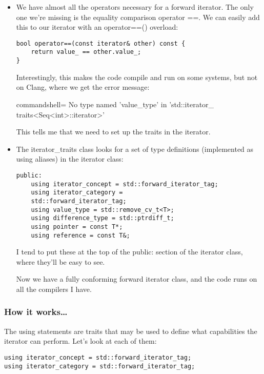 \begin{itemize}
\item 
We have almost all the operators necessary for a forward iterator. The only one we're missing is the equality comparison operator ==. We can easily add this to our iterator with an operator==() overload:

\begin{lstlisting}[style=styleCXX]
bool operator==(const iterator& other) const {
	return value_ == other.value_;
}
\end{lstlisting}

Interestingly, this makes the code compile and run on some systems, but not on Clang, where we get the error message:

\begin{tcblisting}{commandshell={}}
No type named 'value_type' in 'std::iterator_
traits<Seq<int>::iterator>'
\end{tcblisting}

This tells me that we need to set up the traits in the iterator.

\item 
The iterator\_traits class looks for a set of type definitions (implemented as using aliases) in the iterator class:

\begin{lstlisting}[style=styleCXX]
public:
	using iterator_concept = std::forward_iterator_tag;
	using iterator_category =
	std::forward_iterator_tag;
	using value_type = std::remove_cv_t<T>;
	using difference_type = std::ptrdiff_t;
	using pointer = const T*;
	using reference = const T&;
\end{lstlisting}

I tend to put these at the top of the public: section of the iterator class, where they'll be easy to see.

Now we have a fully conforming forward iterator class, and the code runs on all the compilers I have.

\end{itemize}

\subsubsection{How it works…}

The using statements are traits that may be used to define what capabilities the iterator can perform. Let's look at each of them:

\begin{lstlisting}[style=styleCXX]
using iterator_concept = std::forward_iterator_tag;
using iterator_category = std::forward_iterator_tag;
\end{lstlisting}

